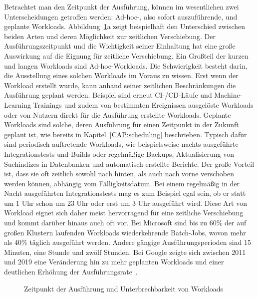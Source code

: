Betrachtet man den Zeitpunkt der Ausführung, können im wesentlichen zwei Unterscheidungen getroffen werden:
Ad-hoc-, also sofort auszuführende, und geplante Workloads.
Abbildung~\ref{FIG:workloads-execution-time-interruptibility}a zeigt beispielhaft den Unterschied zwischen beiden Arten und deren Möglichkeit zur zeitlichen Verschiebung.
Der Ausführungszeitpunkt und die Wichtigkeit seiner Einhaltung hat eine große Auswirkung auf die Eignung für zeitliche Verschiebung.
Ein Großteil der kurzen und langen Workloads sind Ad-hoc-Workloads.
Die Schwierigkeit besteht darin, die Ausstellung eines solchen Workloads im Voraus zu wissen.
Erst wenn der Workload erstellt wurde, kann anhand seiner zeitlichen Beschränkungen die Ausführung geplant werden.
Beispiel sind erneut CI-/CD-Läufe und Machine-Learning Trainings und zudem von bestimmten Ereignissen ausgelöste Workloads oder von Nutzern direkt für die Ausführung erstellte Workloads.
Geplante Workloads sind solche, deren Ausführung für einen Zeitpunkt in der Zukunft geplant ist, wie bereits in Kapitel~\ref{CAP:scheduling} beschrieben.
Typisch dafür sind periodisch auftretende Workloads, wie beispielsweise nachts ausgeführte Integrationstests und Builds oder regelmäßige Backups, Aktualisierung von Suchindizes in Datenbanken und automatisch erstellte Berichte.
Der große Vorteil ist, dass sie oft zeitlich sowohl nach hinten, als auch nach vorne verschoben werden können, abhängig vom Fälligkeitsdatum.
Bei einem regelmäßig in der Nacht ausgeführten Integrationstests mag es zum Beispiel egal sein, ob er statt um 1 Uhr schon um 23 Uhr oder erst um 3 Uhr ausgeführt wird.
Diese Art von Workload eignet sich daher meist hervorragend für eine zeitliche Verschiebung und kommt darüber hinaus auch oft vor.
Bei Microsoft sind bis zu 60\% der auf großen Klustern laufenden Workloads wiederkehrende Batch-Jobs, wovon mehr als 40\% täglich ausgeführt werden.
Andere gängige Ausführungsperioden sind 15 Minuten, eine Stunde und zwölf Stunden.
Bei Google zeigte sich zwischen 2011 und 2019 eine Veränderung hin zu mehr geplanten Workloads und einer deutlichen Erhöhung der Ausführungsrate~\cite{Wiesner.2021}.
\begin{figure}
 \centering
 \qquad
 \caption[Zeitpunkt der Ausführung und Unterbrechbarkeit von Workloads]{Zeitpunkt der Ausführung und Unterbrechbarkeit von Workloads}%
 \label{FIG:workloads-execution-time-interruptibility}%
\end{figure}

